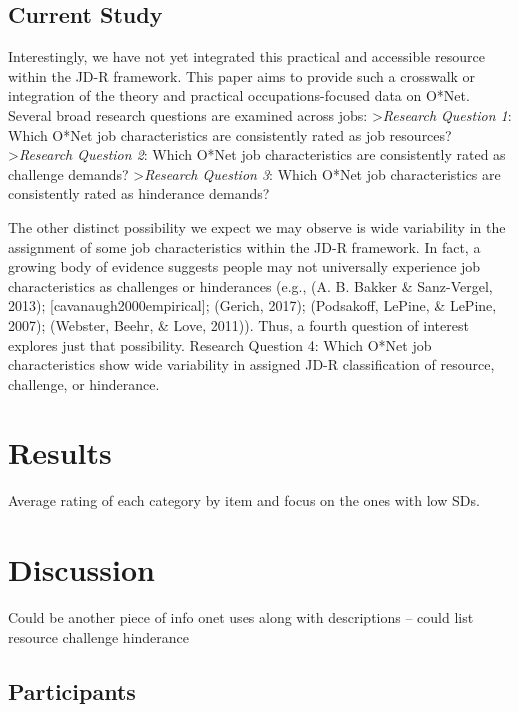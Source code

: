 \documentclass[
  english,
  man]{apa6}
\begin{document}
\hypertarget{current-study}{%
\subsection{Current Study}\label{current-study}}

Interestingly, we have not yet integrated this practical and accessible resource within the JD-R framework. This paper aims to provide such a crosswalk or integration of the theory and practical occupations-focused data on O*Net. Several broad research questions are examined across jobs:
\textgreater{}\emph{Research Question 1}: Which O*Net job characteristics are consistently rated as job resources?
\textgreater{}\emph{Research Question 2}: Which O*Net job characteristics are consistently rated as challenge demands?
\textgreater{}\emph{Research Question 3}: Which O*Net job characteristics are consistently rated as hinderance demands?

The other distinct possibility we expect we may observe is wide variability in the assignment of some job characteristics within the JD-R framework. In fact, a growing body of evidence suggests people may not universally experience job characteristics as challenges or hinderances (e.g., (A. B. Bakker \& Sanz-Vergel, 2013); {[}cavanaugh2000empirical{]}; (Gerich, 2017); (Podsakoff, LePine, \& LePine, 2007); (Webster, Beehr, \& Love, 2011)). Thus, a fourth question of interest explores just that possibility.
Research Question 4: Which O*Net job characteristics show wide variability in assigned JD-R classification of resource, challenge, or hinderance.

\hypertarget{results}{%
\section{Results}\label{results}}

Average rating of each category by item and focus on the ones with low SDs.

\hypertarget{discussion}{%
\section{Discussion}\label{discussion}}

Could be another piece of info onet uses along with descriptions -- could list resource challenge hinderance

\hypertarget{participants-1}{%
\subsection{Participants}\label{participants-1}}
\end{document}
